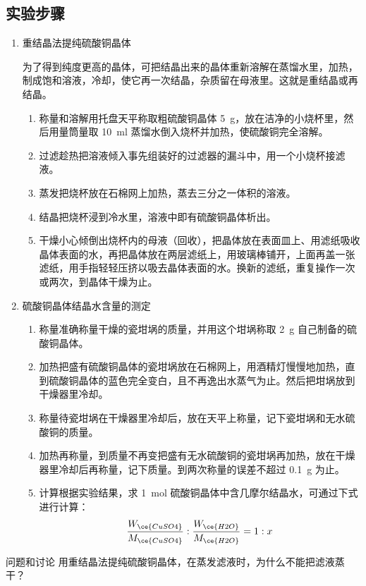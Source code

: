 \subsection*{实验步骤}
\begin{enumerate}[1.]
  \item 重结晶法提纯硫酸铜晶体
  
  为了得到纯度更高的晶体，可把结晶出来的晶体重新溶解在蒸馏水里，加热，制成饱和溶液，冷却，使它再一次结晶，杂质留在母液里。这就是重结晶或再结晶。
  \begin{enumerate}[(1)]
    \item 称量和溶解\quad 用托盘天平称取粗硫酸铜晶体 \qty{5}{g}，放在洁净的小烧杯里，然后用量筒量取 \qty{10}{ml} 蒸馏水倒入烧杯并加热，使硫酸铜完全溶解。
    \item 过滤\quad 趁热把溶液倾入事先组装好的过滤器的漏斗中，用一个小烧杯接滤液。
    \item 蒸发\quad 把烧杯放在石棉网上加热，蒸去三分之一体积的溶液。
    \item 结晶\quad 把烧杯浸到冷水里，溶液中即有硫酸铜晶体析出。
    \item 干燥\quad 小心倾倒出烧杯内的母液（回收），把晶体放在表面皿上、用滤纸吸收晶体表面的水，再把晶体放在两层滤纸上，用玻璃棒铺开，上面再盖一张滤纸，用手指轻轻压挤以吸去晶体表面的水。换新的滤纸，重复操作一次或两次，到晶体干燥为止。
  \end{enumerate}
  \item 硫酸铜晶体结晶水含量的测定
  \begin{enumerate}[(1)]
    \item 称量\quad 准确称量干燥的瓷坩埚的质量，并用这个坩埚称取 \qty{2}{g} 自己制备的硫酸铜晶体。
    \item 加热\quad 把盛有硫酸铜晶体的瓷坩埚放在石棉网上，用酒精灯慢慢地加热，直到硫酸铜晶体的蓝色完全变白，且不再逸出水蒸气为止。然后把坩埚放到干燥器里冷却。
    \item 称量\quad 待瓷坩埚在干燥器里冷却后，放在天平上称量，记下瓷坩埚和无水硫酸铜的质量。
    \item 加热再称量，到质量不再变\quad 把盛有无水硫酸铜的瓷坩埚再加热，放在干燥器里冷却后再称量，记下质量。到两次称量的误差不超过 \qty{0.1}{g} 为止。
    \item 计算\quad 根据实验结果，求 \qty{1}{mol} 硫酸铜晶体中含几摩尔结晶水，可通过下式进行计算：
    \[ \frac{W_{\ce{CuSO4}}}{M_{\ce{CuSO4}}}:\frac{W_{\ce{H2O}}}{M_{\ce{H2O}}} =1:x \]
  \end{enumerate}
\end{enumerate}
\begin{Theorem}{问题和讨论}
用重结晶法提纯硫酸铜晶体，在蒸发滤液时，为什么不能把滤液蒸干？
\end{Theorem}


